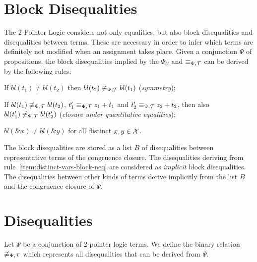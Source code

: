 \section{Block Disequalities}

The 2-Pointer Logic considers not only equalities, but also block disequalities and disequalities between terms.
These are necessary in order to infer which terms are definitely not
modified when an assignment takes place.
Given a conjunction $\Psi$ of propositions, the block disequalities implied by the $\Psi_{bl}$
and $\equiv_{\Psi,\mathcal{T}}$ can be derived by the following rules:

\begin{enumerate}[label={[B\arabic*]}, ref={[B\arabic*]}]
    \setcounter{enumi}{-1} %
    \item	If $bl(t_1)\neq bl(t_2)$ then $bl(t_2)\not\equiv_{\Psi,\mathcal{T}} bl(t_1)$ (\emph{symmetry});
          \item\label{item:closure-under-quantitative-equalities}
          If $bl(t_1)\not\equiv_{\Psi,\mathcal{T}} bl(t_2)$, $t'_1 \equiv_{\Psi,\mathcal{T}} z_1+t_1$ and $t'_2\equiv_{\Psi,\mathcal{T}} z_2+t_2$, then
          also $bl(t'_1)\not\equiv_{\Psi,\mathcal{T}} bl(t'_2)$ (\emph{closure under quantitative equalities});
          \item\label{item:distinct-vars-block-neq} $bl(\&x) \neq bl(\&y)$ for all distinct $x, y \in \mathcal{X}$.
\end{enumerate}

The block disequalities are stored as a list $B$ of disequalities between representative terms
of the congruence closure.
The disequalities deriving from rule~\ref{item:distinct-vars-block-neq} are considered as \emph{implicit} block disequalities.
The disequalities between other kinds of terms derive implicitly from the list $B$ and the congruence closure of $\Psi$.

\section{Disequalities}\label{disequalities}

Let $\Psi$ be a conjunction of 2-pointer logic terms.
We define the binary relation $\not\equiv_{\Psi,\mathcal{T}}$ which represents all disequalities that can be derived from $\Psi$.

